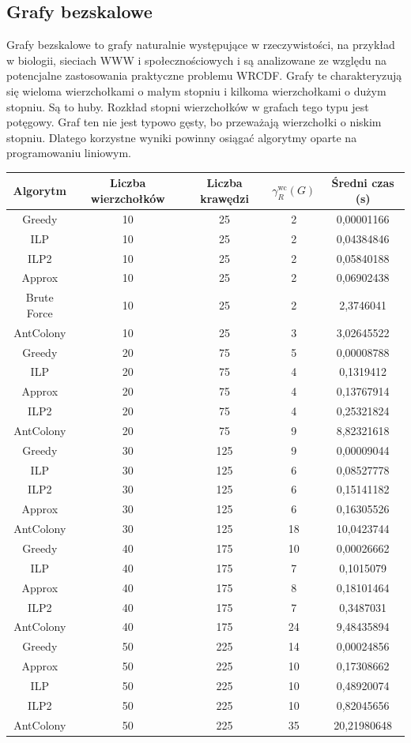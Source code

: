 \subsection{Grafy bezskalowe}

Grafy bezskalowe to grafy naturalnie występujące w rzeczywistości, na przykład w biologii, sieciach WWW i społecznościowych i są analizowane ze względu na potencjalne zastosowania praktyczne problemu WRCDF. Grafy te charakteryzują się wieloma wierzchołkami o małym stopniu i kilkoma wierzchołkami o dużym stopniu. Są to huby. Rozkład stopni wierzchołków w grafach tego typu jest potęgowy. Graf ten nie jest typowo gęsty, bo przeważają wierzchołki o niskim stopniu. Dlatego korzystne wyniki powinny osiągać algorytmy oparte na programowaniu liniowym.

\begin{table}[H]
    \centering
    \begin{tabular}{|c|c|c|c|c|}
    \hline
    Algorytm & Liczba wierzchołków & Liczba krawędzi & $\gamma^{\text{wc}}_R(G)$ & Średni czas (s) \\
    \hline
    Greedy & 10 & 25 & 2 & 0,00001166 \\
    ILP & 10 & 25 & 2 & 0,04384846 \\
    ILP2 & 10 & 25 & 2 & 0,05840188 \\
    Approx & 10 & 25 & 2 & 0,06902438 \\
    Brute Force & 10 & 25 & 2 & 2,3746041 \\
    AntColony & 10 & 25 & 3 & 3,02645522 \\
     \hline
     Greedy & 20 & 75 & 5 & 0,00008788 \\
     ILP & 20 & 75 & 4 & 0,1319412 \\
     Approx & 20 & 75 & 4 & 0,13767914 \\
     ILP2 & 20 & 75 & 4 & 0,25321824 \\
     AntColony & 20 & 75 & 9 & 8,82321618 \\ 
    \hline
    Greedy & 30 & 125 & 9 & 0,00009044 \\
    ILP & 30 & 125 & 6 & 0,08527778 \\
    ILP2 & 30 & 125 & 6 & 0,15141182 \\
    Approx & 30 & 125 & 6 & 0,16305526 \\
    AntColony & 30 & 125 & 18 & 10,0423744 \\ 
    \hline
    Greedy & 40 & 175 & 10 & 0,00026662 \\
    ILP & 40 & 175 & 7 & 0,1015079 \\
    Approx & 40 & 175 & 8 & 0,18101464 \\
    ILP2 & 40 & 175 & 7 & 0,3487031 \\
    AntColony & 40 & 175 & 24 & 9,48435894 \\
    \hline
    Greedy & 50 & 225 & 14 & 0,00024856 \\
    Approx & 50 & 225 & 10 & 0,17308662 \\
    ILP & 50 & 225 & 10 & 0,48920074 \\
    ILP2 & 50 & 225 & 10 & 0,82045656 \\
    AntColony & 50 & 225 & 35 & 20,21980648 \\
    

\end{tabular}
\end{table}
